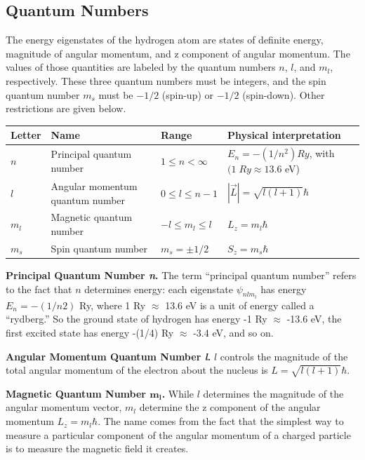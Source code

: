 \documentclass[../main.tex]{subfiles}
\begin{document}
\subsection*{Quantum Numbers}
The energy eigenstates of the hydrogen atom are states of definite energy, magnitude of angular momentum, and z component of angular momentum. The values of those quantities are labeled by the quantum numbers $n$, $l$, and $m_l$, respectively. These three quantum numbers must be integers, and the spin quantum number $m_s$ must be $-1/2$ (spin-up) or $-1/2$ (spin-down). Other restrictions are given below.
\begin{center}
    \begin{tabular}{| p{} | p{} | p{} | p{}|}
        \hline
        Letter&Name&Range&Physical interpretation\\
        \hline
        $n$&Principal quantum number&$1 \leq n <\infty$&$E_n = -(1/n^2) Ry$, with $ (1 \;Ry \approx 13.6$ eV)\\
        $l$&Angular momentum quantum number&$0 \leq l \leq n - 1$ &$ |\overrightarrow{L}| = \sqrt{l(l + 1) }\hbar$\\
        $m_l$&Magnetic quantum number&$-l \leq m_l \leq l$&$L_z = m_l\hbar$\\
        $m_s$&Spin quantum number&$m_s = \pm 1/2$&$S_z = m_s\hbar$\\\hline
    \end{tabular}
\end{center}

\textbf{Principal Quantum Number \emph{n}.} The term “principal quantum number” refers to the fact that $n$ determines energy: each eigenstate $\psi_{nlm_l}$  has energy $E_n = -(1/n2)$ Ry, where 1 Ry $\approx$ 13.6 eV is a unit of energy called a “rydberg.” So the ground state of hydrogen has energy -1 Ry $\approx$ -13.6 eV, the first excited state has energy -(1/4) Ry $\approx$ -3.4 eV, and so on.

\textbf{Angular Momentum Quantum Number \emph{l}.} $l$ controls the magnitude of the total angular momentum of the electron about the nucleus is $L = \sqrt{l(l + 1)} \hbar$.

\textbf{Magnetic Quantum Number $\boldsymbol{m_l}$.}  While $l$ determines the magnitude of the angular momentum vector, $m_l$ determine the z component of the angular momentum $L_z = m_l \hbar$. The name comes from the fact that the simplest way to measure a particular component of the angular momentum of a charged particle is to measure the magnetic field it creates.
\end{document}
